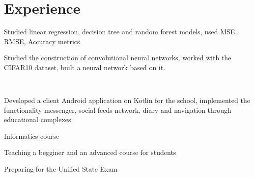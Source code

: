 \documentclass[]{resume}
\begin{document}
\begin{minipage}[t]{0.66\textwidth} 


\section{Experience}

\vspace{\topsep} %
\begin{tightemize} 

\item Studied linear regression, decision tree and random forest models, used MSE, RMSE, Accuracy metrics
\item Studied the construction of convolutional neural networks, worked with the CIFAR10 dataset, built a neural network based on it.
\end{tightemize}
\sectionsep
{}
\
\begin{tightemize}

\item Developed a client Android application on Kotlin for the school, implemented the functionality
messenger, social feeds network, diary and navigation through educational complexes.
\end{tightemize}

\vspace{\topsep}
\begin{tightemize}

\item{Informatics course}
\item{Teaching a begginer and an advanced course for students }
\item{Preparing for the Unified State Exam}

\end{tightemize}


\end{minipage}
\end{document}
